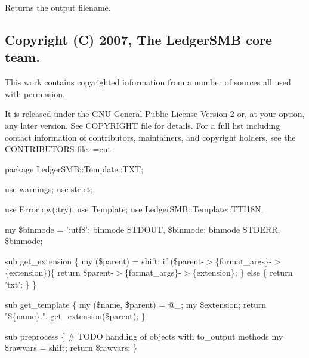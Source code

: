 \begin{description}
\begin{description}
\begin{description}
\begin{description}
\begin{description}
\begin{description}
\begin{description}
\begin{description}
\begin{description}
\begin{description}
\begin{description}
Returns the output filename.

\end{description}
\subsection*{Copyright (C) 2007, The LedgerSMB core team.\label{LedgerSMB::Template::TXT_Copyright_C_2007_The_LedgerSMB_core_team_}}


This work contains copyrighted information from a number of sources all used
with permission.



It is released under the GNU General Public License Version 2 or, at your 
option, any later version.  See COPYRIGHT file for details.  For a full list 
including contact information of contributors, maintainers, and copyright 
holders, see the CONTRIBUTORS file.
=cut



package LedgerSMB::Template::TXT;



use warnings;
use strict;



use Error qw(:try);
use Template;
use LedgerSMB::Template::TTI18N;



my \$binmode = ':utf8';
binmode STDOUT, \$binmode;
binmode STDERR, \$binmode;



sub get\_extension \{
    my (\$parent) = shift;
    if (\$parent-$>$\{format\_args\}-$>$\{extension\})\{
        return \$parent-$>$\{format\_args\}-$>$\{extension\};
    \} else \{
        return 'txt';
    \}
\}



sub get\_template \{
    my (\$name, \$parent) = @\_;
    my \$extension;
    return "\$\{name\}.". get\_extension(\$parent);
\}



sub preprocess \{ \# TODO handling of objects with to\_output methods
    my \$rawvars = shift;
    return \$rawvars;
\}




\end{description}
\end{description}
\end{description}
\end{description}
\end{description}
\end{description}
\end{description}
\end{description}
\end{description}
\end{description}
